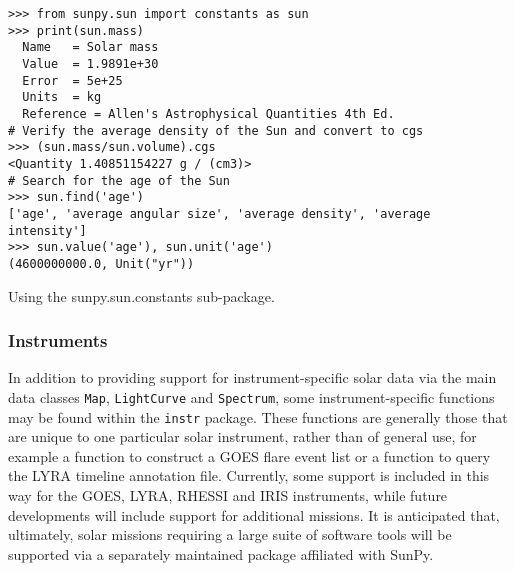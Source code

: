 \begin{listing}[H]
\begin{verbatim}
>>> from sunpy.sun import constants as sun
>>> print(sun.mass)
  Name   = Solar mass
  Value  = 1.9891e+30
  Error  = 5e+25
  Units  = kg
  Reference = Allen's Astrophysical Quantities 4th Ed.
# Verify the average density of the Sun and convert to cgs
>>> (sun.mass/sun.volume).cgs
<Quantity 1.40851154227 g / (cm3)>
# Search for the age of the Sun
>>> sun.find('age')
['age', 'average angular size', 'average density', 'average intensity']
>>> sun.value('age'), sun.unit('age')
(4600000000.0, Unit("yr"))
\end{verbatim}
\caption{Using the sunpy.sun.constants sub-package.}
\label{code:constants_code}
\end{listing}
	
\subsubsection{Instruments}
In addition to providing support for instrument-specific solar data via the main data 
classes \texttt{Map}, \texttt{LightCurve} and \texttt{Spectrum}, 
some instrument-specific functions may be found within the \texttt{instr} package. 
These functions are generally those that are unique to one particular solar instrument, 
rather than of general use, for example a function to construct a GOES flare event list 
or a function to query the LYRA timeline annotation file. Currently, some support is included
 in this way for the GOES, LYRA, RHESSI and IRIS instruments, while future developments 
 will include support for additional missions. It is anticipated that, ultimately, solar
  missions requiring a large suite of software tools will be supported via a separately 
  maintained package affiliated with SunPy.

